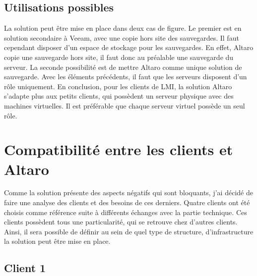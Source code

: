 \documentclass[pfe]{tnreport} %
\begin{document}
\subsection{Utilisations possibles}

La solution peut être mise en place dans deux cas de figure. \newline
Le premier est en solution secondaire à Veeam, avec une copie hors site des sauvegardes. Il faut cependant disposer d'un espace de stockage pour les sauvegardes. En effet, Altaro copie une sauvegarde hors site, il faut donc au préalable une sauvegarde du serveur. \newline
La seconde possibilité est de mettre Altaro comme unique solution de sauvegarde. Avec les éléments précédents, il faut que les serveurs disposent d'un rôle uniquement. \newline
En conclusion, pour les clients de LMI, la solution Altaro s'adapte plus aux petits clients, qui possèdent un serveur physique avec des machines virtuelles. Il est préférable que chaque serveur virtuel possède un seul rôle.
\newpage

\section{Compatibilité entre les clients et Altaro}

Comme la solution présente des aspects négatifs qui sont bloquants, j'ai décidé de faire une analyse des clients et des besoins de ces derniers. \newline
Quatre clients ont été choisis comme référence suite à différents échanges avec la partie technique. Ces clients possèdent tous une particularité, qui se retrouve chez d'autres clients. \newline
Ainsi, il sera possible de définir au sein de quel type de structure, d'infrastructure la solution peut être mise en place. \newline

\subsection{Client 1}
\end{document}

